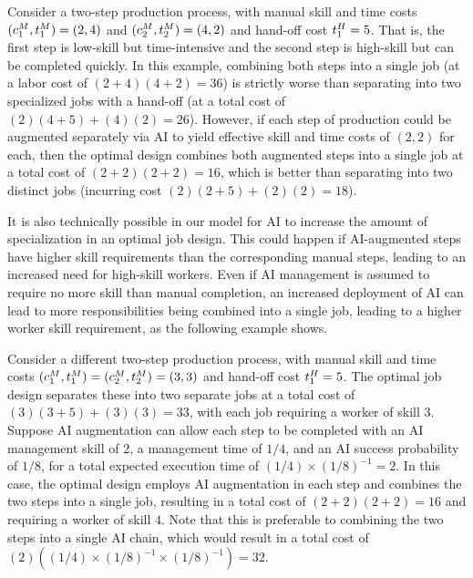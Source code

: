 \begin{example}
   Consider a two-step production process, with manual skill and time costs $(c^{M}_{1}, t^{M}_{1}) = (2,4)$ and $(c^{M}_{2}, t^{M}_{2}) = (4,2)$ and hand-off cost $t^{H}_{1} = 5$.
   That is, the first step is low-skill but time-intensive and the second step is high-skill but can be completed quickly.
   In this example, combining both steps into a single job (at a labor cost of $(2+4)(4+2) = 36$) is strictly worse than separating into two specialized jobs with a hand-off (at a total cost of $(2)(4+5) + (4)(2) = 26$).
   However, if each step of production could be augmented separately via AI to yield effective skill and time costs of $(2,2)$ for each, then the optimal design combines both augmented steps into a single job at a total cost of $(2+2)(2+2) = 16$, which is better than separating into two distinct jobs (incurring cost $(2)(2+5) + (2)(2) = 18$).
\end{example}

It is also technically possible in our model for AI to increase the amount of specialization in an optimal job design.  
This could happen if AI-augmented steps have higher skill requirements than the corresponding manual steps, leading to an increased need for high-skill workers.  
Even if AI management is assumed to require no more skill than manual completion, an increased deployment of AI can lead to more responsibilities being combined into a single job, leading to a higher worker skill requirement, as the following example shows. 

\begin{example}
   Consider a different two-step production process, with manual skill and time costs $(c^{M}_{1}, t^{M}_{1}) = (c^{M}_{2}, t^{M}_{2}) = (3,3)$ and hand-off cost $t^{H}_{1} = 5$.
   The optimal job design separates these into two separate jobs at a total cost of $(3)(3+5) + (3)(3) = 33$, with each job requiring a worker of skill $3$.
   Suppose AI augmentation can allow each step to be completed with an AI management skill of $2$, a management time of $1/4$, and an AI success probability of $1/8$, for a total expected execution time of $(1/4) \times (1/8)^{-1} = 2$.
   In this case, the optimal design employs AI augmentation in each step and combines the two steps into a single job, resulting in a total cost of $(2+2)(2+2) = 16$ and requiring a worker of skill $4$.
   Note that this is preferable to combining the two steps into a single AI chain, which would result in a total cost of $(2)( (1/4) \times (1/8)^{-1} \times (1/8)^{-1} ) = 32$.
\end{example}



